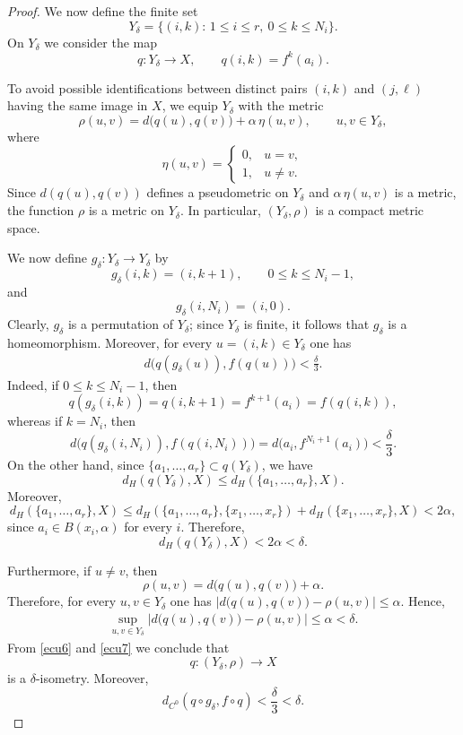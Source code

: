 \documentclass{amsart}
\numberwithin{equation}{section}
\theoremstyle{remark}
\begin{document}
\begin{proof}
We now define the finite set
\[
Y_\delta=\{(i,k):\,1\le i\le r,\ 0\le k\le N_i\}.
\]
On $Y_\delta$ we consider the map
\[
q:Y_\delta\to X,
\qquad
q(i,k)=f^k(a_i).
\]

To avoid possible identifications between distinct pairs $(i,k)$ and $(j,\ell)$ having the same image in $X$, we equip $Y_\delta$ with the metric
\[
\rho(u,v)=d\bigl(q(u),q(v)\bigr)+\alpha\,\eta(u,v),
\qquad u,v\in Y_\delta,
\]
where
\[
\eta(u,v)=
\begin{cases}
0,& u=v,\\
1,& u\neq v.
\end{cases}
\]
Since $d(q(u),q(v))$ defines a pseudometric on $Y_\delta$ and $\alpha\,\eta(u,v)$ is a metric, the function $\rho$ is a metric on $Y_\delta$. In particular, $(Y_\delta,\rho)$ is a compact metric space.

We now define $g_\delta:Y_\delta\to Y_\delta$ by
\[
g_\delta(i,k)=(i,k+1), \qquad 0\le k\le N_i-1,
\]
and
\[
g_\delta(i,N_i)=(i,0).
\]
Clearly, $g_\delta$ is a permutation of $Y_\delta$; since $Y_\delta$ is finite, it follows that $g_\delta$ is a homeomorphism. Moreover, for every $u=(i,k)\in Y_\delta$ one has
\begin{eqnarray}\label{ecu1.2}
d\bigl(q(g_\delta(u)),f(q(u))\bigr)<\frac{\delta}{3}.
\end{eqnarray}
Indeed, if $0\le k\le N_i-1$, then
\[
q(g_\delta(i,k))=q(i,k+1)=f^{k+1}(a_i)=f(q(i,k)),
\]
whereas if $k=N_i$, then
\[
d\bigl(q(g_\delta(i,N_i)),f(q(i,N_i))\bigr)
=
d\bigl(a_i,f^{N_i+1}(a_i)\bigr)
<
\frac{\delta}{3}.
\]
On the other hand, since $\{a_1,\dots,a_r\}\subset q(Y_\delta)$, we have
\[
d_H(q(Y_\delta),X)\le d_H(\{a_1,\dots,a_r\},X).
\]
Moreover,
\[
d_H(\{a_1,\dots,a_r\},X)
\le
 d_H(\{a_1,\dots,a_r\},\{x_1,\dots,x_r\})
+
d_H(\{x_1,\dots,x_r\},X)
<
2\alpha,
\]
since $a_i\in B(x_i,\alpha)$ for every $i$. Therefore,
\begin{equation}\label{ecu6}
d_H(q(Y_\delta),X)<2\alpha<\delta.
\end{equation}

Furthermore, if $u\neq v$, then
\[
\rho(u,v)=d\bigl(q(u),q(v)\bigr)+\alpha.
\]
Therefore, for every $u,v\in Y_\delta$ one has $\bigl|d\bigl(q(u),q(v)\bigr)-\rho(u,v)\bigr|\le \alpha$. 
Hence,
\begin{eqnarray}\label{ecu7}
\sup_{u,v\in Y_\delta}
\bigl|d\bigl(q(u),q(v)\bigr)-\rho(u,v)\bigr|
\le \alpha<\delta.
\end{eqnarray}
From \eqref{ecu6} and \eqref{ecu7} we conclude that
\[
q:(Y_\delta,\rho)\to X
\]
is a $\delta$-isometry. Moreover,
\[
d_{C^0}(q\circ g_\delta,f\circ q)<\frac{\delta}{3}<\delta.
\]


\end{proof}
\end{document}
